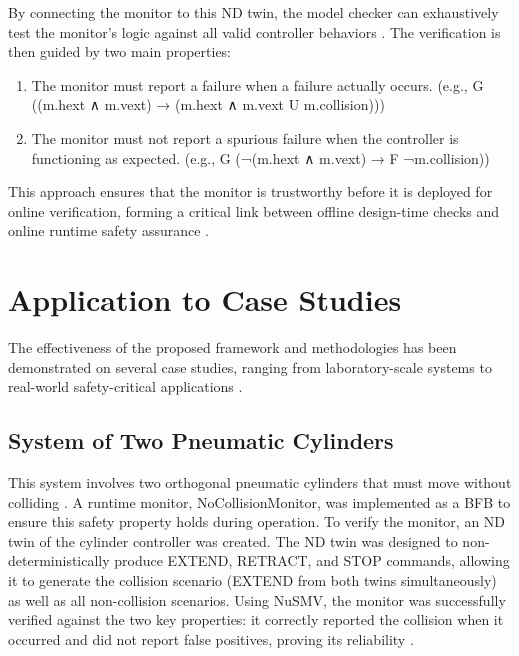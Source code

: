 By connecting the monitor to this ND twin, the model checker can exhaustively test the monitor's logic against all valid controller behaviors . The verification is then guided by two main properties:

\begin{enumerate}
\item The monitor must report a failure when a failure actually occurs. (e.g., G ((m.hext ∧ m.vext) → (m.hext ∧ m.vext U m.collision)))
\item The monitor must not report a spurious failure when the controller is functioning as expected. (e.g., G (¬(m.hext ∧ m.vext) → F ¬m.collision))
\end{enumerate}

This approach ensures that the monitor is trustworthy before it is deployed for online verification, forming a critical link between offline design-time checks and online runtime safety assurance .

\section{Application to Case Studies}\label{sec:case_studies}

The effectiveness of the proposed framework and methodologies has been demonstrated on several case studies, ranging from laboratory-scale systems to real-world safety-critical applications .

\subsection{System of Two Pneumatic Cylinders}

This system involves two orthogonal pneumatic cylinders that must move without colliding . A runtime monitor, NoCollisionMonitor, was implemented as a BFB to ensure this safety property holds during operation. To verify the monitor, an ND twin of the cylinder controller was created. The ND twin was designed to non-deterministically produce EXTEND, RETRACT, and STOP commands, allowing it to generate the collision scenario (EXTEND from both twins simultaneously) as well as all non-collision scenarios. Using NuSMV, the monitor was successfully verified against the two key properties: it correctly reported the collision when it occurred and did not report false positives, proving its reliability .

